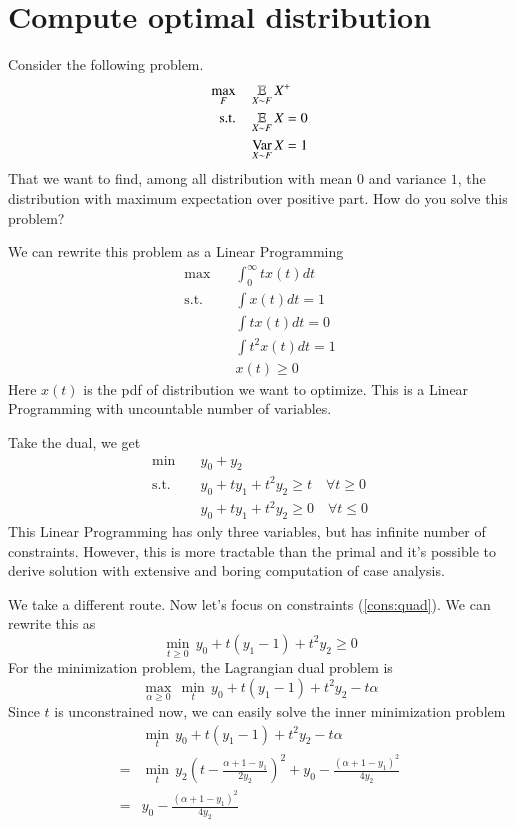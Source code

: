 \section{Compute optimal distribution}

Consider the following problem.
\begin{align}
\max_{F} \quad & \operatorname*{\mathbb{E}}_{X \sim F} X^+ \\
\text{s.t.} \quad & \operatorname*{\mathbb{E}}_{X \sim F} X = 0    \\
& \operatorname*{Var}_{X \sim F} X = 1
\end{align}
That we want to find, among all distribution with mean $0$ and variance $1$, the distribution with maximum expectation over positive part.
How do you solve this problem?

We can rewrite this problem as a Linear Programming
\begin{align}
\max \quad & \int_0^\infty t x(t) dt    \\
\text{s.t.} \quad & \int x(t) dt = 1    \\
& \int t x(t) dt = 0    \\
& \int t^2 x(t) dt = 1  \\
& x(t) \ge 0
\end{align}
Here $x(t)$ is the pdf of distribution we want to optimize.
This is a Linear Programming with uncountable number of variables.

Take the dual, we get
\begin{align}
\min \quad & y_0 + y_2  \\
\text{s.t.} \quad & y_0 + ty_1 + t^2y_2 \ge t \quad \forall t \ge 0 \label{cons:quad} \\
& y_0 + ty_1 + t^2y_2 \ge 0 \quad \forall t \le 0 \label{cons:quad2}
\end{align}
This Linear Programming has only three variables, but has infinite number of constraints.
However, this is more tractable than the primal and it's possible to derive solution
with extensive and boring computation of case analysis.

We take a different route. Now let's focus on constraints (\ref{cons:quad}).
We can rewrite this as
\[  \min_{t \ge 0} \, y_0 + t(y_1 - 1) + t^2y_2 \ge 0  \]
For the minimization problem, the Lagrangian dual problem is
\[  \max_{\alpha \ge 0} \, \min_t \, y_0 + t(y_1 - 1) + t^2 y_2 - t \alpha    \]
Since $t$ is unconstrained now, we can easily solve the inner minimization problem
\begin{align}
 & \min_t \, y_0 + t(y_1 - 1) + t^2 y_2 - t \alpha   \\
=& \min_t \, y_2(t - \frac{\alpha + 1 - y_1}{2y_2})^2 + y_0 - \frac{(\alpha + 1 - y_1)^2}{4y_2} \\
=& y_0 - \frac{(\alpha + 1 - y_1)^2}{4y_2}
\end{align}

